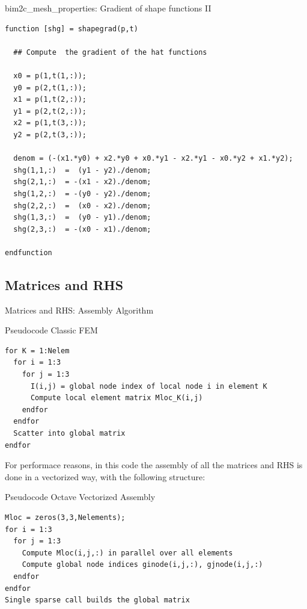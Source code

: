 \documentclass[aspectratio=54,xcolor=dvipsnames]{beamer}
\begin{document}
\begin{frame}[fragile]{bim2c\_mesh\_properties: Gradient of shape functions II}
\scriptsize
\begin{lstlisting}[firstnumber=427]
function [shg] = shapegrad(p,t)
  
  ## Compute  the gradient of the hat functions
  
  x0 = p(1,t(1,:));
  y0 = p(2,t(1,:));
  x1 = p(1,t(2,:));
  y1 = p(2,t(2,:));
  x2 = p(1,t(3,:));
  y2 = p(2,t(3,:));

  denom = (-(x1.*y0) + x2.*y0 + x0.*y1 - x2.*y1 - x0.*y2 + x1.*y2);
  shg(1,1,:)  =  (y1 - y2)./denom;
  shg(2,1,:)  = -(x1 - x2)./denom;
  shg(1,2,:)  = -(y0 - y2)./denom;
  shg(2,2,:)  =  (x0 - x2)./denom;
  shg(1,3,:)  =  (y0 - y1)./denom;
  shg(2,3,:)  = -(x0 - x1)./denom;

endfunction
\end{lstlisting}
\end{frame}

\subsection{Matrices and RHS}
\begin{frame}[fragile]{Matrices and RHS: Assembly Algorithm}
\scriptsize
\begin{block}{Pseudocode Classic FEM}
\begin{verbatim}
for K = 1:Nelem
  for i = 1:3
    for j = 1:3
      I(i,j) = global node index of local node i in element K
      Compute local element matrix Mloc_K(i,j)
    endfor
  endfor
  Scatter into global matrix
endfor
\end{verbatim}
\end{block}

For performace reasons, in this code the assembly of all the matrices and RHS is done in a vectorized way, with the following structure:
\begin{block}{Pseudocode Octave Vectorized Assembly}
\begin{verbatim}
Mloc = zeros(3,3,Nelements);
for i = 1:3
  for j = 1:3
    Compute Mloc(i,j,:) in parallel over all elements
    Compute global node indices ginode(i,j,:), gjnode(i,j,:) 
  endfor
endfor
Single sparse call builds the global matrix
\end{verbatim}
\end{block}
\end{frame}
\end{document}
